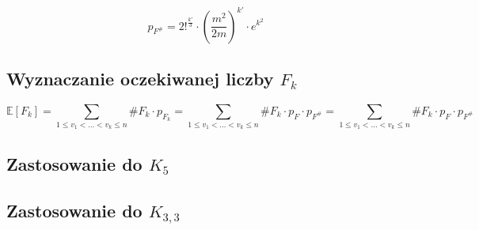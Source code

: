 \documentclass{article}
\begin{document}
\begin{dmath}
  p_{F^\#} = 2!^{\frac{k'}{3}} \cdot (\frac{m^2}{2m})^{k'} \cdot e^{k^2}
\end{dmath}

\subsection{Wyznaczanie oczekiwanej liczby $F_k$}
\begin{dmath}
  \mathbb{E}[F_k] = \sum_{1 \leq v_1 < \ldots < v_k \leq n} \#F_k \cdot p_{F_k}
  = \sum_{1 \leq v_1 < \ldots < v_k \leq n} \#F_k \cdot p_{F} \cdot p_{F^\#}
  = \sum_{1 \leq v_1 < \ldots < v_k \leq n} \#F_k \cdot p_{F} \cdot p_{F^\#}
\end{dmath}


\subsection{Zastosowanie do $K_5$}

\subsection{Zastosowanie do $K_{3,3}$}
\end{document}
